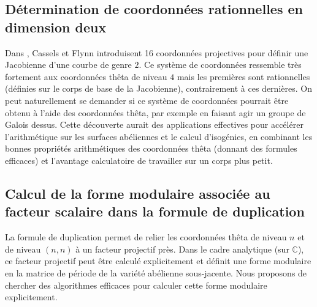 \documentclass[a4paper,10pt]{scrartcl}
\theoremstyle{definition}
\theoremstyle{plain}
\theoremstyle{definition}
\def\C{\mathbb{C}}
\renewcommand{\(}{\left(}
\renewcommand{\)}{\right)}
\begin{document}
\subsection{Détermination de coordonnées rationnelles en dimension deux}

Dans \cite[Chapitre~2]{Prolegomena}, Cassels et Flynn introduisent 16 coordonnées projectives pour définir une Jacobienne d'une courbe de genre $2$. Ce système de coordonnées ressemble très fortement aux coordonnées thêta de niveau $4$ mais les premières sont rationnelles (définies sur le corps de base de la Jacobienne), contrairement à ces dernières. On peut naturellement se demander si ce système de coordonnées pourrait être obtenu à l'aide des coordonnées thêta, par exemple en faisant agir un groupe de Galois dessus. Cette découverte aurait des applications effectives pour accélérer l'arithmétique sur les surfaces abéliennes et le calcul d'isogénies,  en combinant les bonnes propriétés arithmétiques des coordonnées thêta (donnant des formules efficaces) et l'avantage calculatoire de travailler sur un corps plus petit.

\subsection{Calcul de la forme modulaire associée au facteur scalaire dans la formule de duplication}

La formule de duplication permet de relier les coordonnées thêta de niveau $n$ et de niveau $(n,n)$ à un facteur projectif près. Dans le cadre analytique (sur $\C$), ce facteur projectif peut être calculé explicitement et définit une forme modulaire en la matrice de période de la variété abélienne sous-jacente. Nous proposons de chercher des algorithmes efficaces pour calculer cette forme modulaire explicitement.  

\newpage


 
\end{document}
